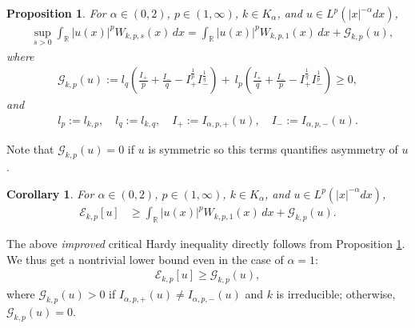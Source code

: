 \documentclass[12pt, a4paper]{amsart}
\newtheorem{corollary}[theorem]{Corollary}
\newtheorem{proposition}[theorem]{Proposition}
\newcommand{\R}{\mathbb{R}}
\newcommand{\E}{\mathcal{E}}
\begin{document}
\begin{proposition}
\label{proposition: extra term}
For $\alpha \in (0, 2)$, $p \in (1, \infty)$, $k \in K_\alpha$, and $u \in L^p(|x|^{-\alpha}dx)$,
\begin{align}
\label{equation: corrected inequality}
    &\sup_{s>0}\int_{\R} |u(x)|^p W_{k,p,s}(x)\,dx = \int_{\R}|u(x)|^p W_{k, p, 1}(x)\,dx + \mathcal{G}_{k, p}(u),
\end{align}
where
\begin{align*}
    \mathcal{G}_{k, p}(u) := l_{q}\left(\frac{I_{+}}{p}+\frac{I_{-}}{q}-I_{+}^{\frac{1}{p}}I_{-}^{\frac{1}{q}}\right)+\ l_{p}\left(\frac{I_{+}}{q}+\frac{I_{-}}{p}-I_{+}^{\frac{1}{q}}I_{-}^{\frac{1}{p}}\right)\geq 0,
\end{align*}
and
\begin{align*}
    l_p := l_{k, p}, \quad l_q := l_{k, q}, \quad I_+ := I_{\alpha, p, +}(u), \quad I_- := I_{\alpha, p, -}(u).
\end{align*}
\end{proposition}
Note that $\mathcal{G}_{k,p}(u)=0$ if $u$ is symmetric so this terms quantifies asymmetry of $u$.
\begin{corollary}\label{c.pnH}
For $\alpha \in (0, 2)$, $p \in (1, \infty)$, $k \in K_\alpha$, and $u \in L^p(|x|^{-\alpha}dx)$,
\begin{align}
\label{e.iHi} 
    \E_{k, p}[u] &\geq 
 \int_{\R}|u(x)|^p W_{k, p, 1}(x)\,dx + \mathcal{G}_{k, p}(u).
\end{align}    
\end{corollary}
The above \textit{improved} critical Hardy inequality directly follows from Proposition \cref{proposition: extra term}. We thus get a nontrivial lower bound even in the case of $\alpha=1$:
\begin{align*}
    \E_{k, p}[u] \geq \mathcal{G}_{k, p}(u),
\end{align*}
where $\mathcal{G}_{k, p}(u) > 0$ if
  $I_{\alpha, p, +}(u) \neq   I_{\alpha, p, -}(u)$ and $k$ is irreducible; otherwise, $\mathcal{G}_{k, p}(u) = 0$.
\end{document}
